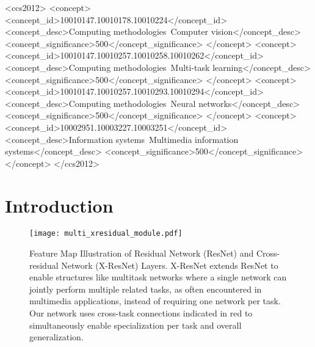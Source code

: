 \documentclass{sig-alternate-05-2015}
\begin{document}
\begin{CCSXML}
<ccs2012>
  <concept>
    <concept_id>10010147.10010178.10010224</concept_id>
    <concept_desc>Computing methodologies~Computer vision</concept_desc>
    <concept_significance>500</concept_significance>
  </concept>
  <concept>
    <concept_id>10010147.10010257.10010258.10010262</concept_id>
    <concept_desc>Computing methodologies~Multi-task learning</concept_desc>
    <concept_significance>500</concept_significance>
  </concept>
  <concept>
    <concept_id>10010147.10010257.10010293.10010294</concept_id>
    <concept_desc>Computing methodologies~Neural networks</concept_desc>
    <concept_significance>500</concept_significance>
  </concept>
  <concept>
    <concept_id>10002951.10003227.10003251</concept_id>
    <concept_desc>Information systems~Multimedia information systems</concept_desc>
    <concept_significance>500</concept_significance>
  </concept>
</ccs2012>
\end{CCSXML}



\printccsdesc



\section{Introduction}
\label{sec:intro}

\begin{figure}[t]
  \centering
  \texttt{[image: multi\_xresidual\_module.pdf]}
  \caption{Feature Map Illustration of Residual Network (ResNet) and Cross-residual Network (X-ResNet) Layers. X-ResNet extends ResNet to enable structures like multitask networks where a single network can jointly perform multiple related tasks, as often encountered in multimedia applications, instead of requiring one network per task. Our network uses cross-task connections indicated in red to simultaneously enable specialization per task and overall generalization.}
  \label{fig:overview}
\end{figure}
\end{document}
